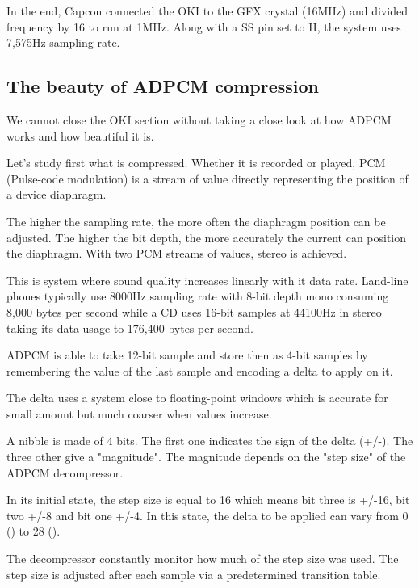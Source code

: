 In the end, Capcon connected the OKI to the GFX crystal (16MHz) and divided frequency by 16 to run at 1MHz. Along with a SS pin set to H, the system uses 7,575Hz sampling rate.




\subsection{The beauty of ADPCM compression} %
We cannot close the OKI section without taking a close look at how ADPCM works and how beautiful it is.

Let's study first what is compressed. Whether it is recorded or played, PCM (Pulse-code modulation) is a stream of value directly representing the position of a device diaphragm.


The higher the sampling rate, the more often the diaphragm position can be adjusted. The higher the bit depth, the more accurately the current can position the diaphragm. With two PCM streams of values, stereo is achieved.

This is system where sound quality increases linearly with it data rate. Land-line phones typically use 8000Hz sampling rate with 8-bit depth mono consuming 8,000 bytes per second while a CD uses 16-bit samples at 44100Hz in stereo taking its data usage to 176,400 bytes per second.
\pagebreak

ADPCM is able to take 12-bit sample and store then as 4-bit samples by remembering the value of the last sample and encoding a delta to apply on it. 

The delta uses a system close to floating-point windows which is accurate for small amount but much coarser when values increase. 

A nibble is made of 4 bits. The first one indicates the sign of the delta (+/-). The three other give a "magnitude". The magnitude depends on the "step size" of the ADPCM decompressor.


In its initial state, the step size is equal to 16 which means bit three is +/-16, bit two +/-8 and bit one +/-4. In this state, the delta to be applied can vary from 0 () to 28 (). 

The decompressor constantly monitor how much of the step size was used. The step size is adjusted after each sample via a  predetermined transition table.

